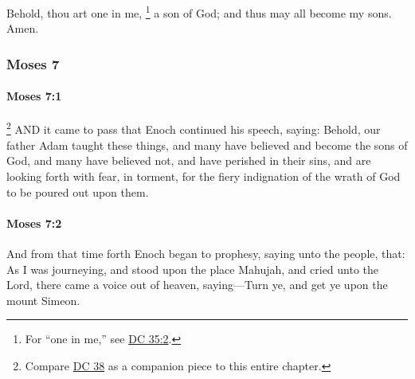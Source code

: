 			Behold, thou art one in me,%
				\footnote{%
					For ``one in me,'' see \hyperref[DC35-2]{DC 35:2}.
					}
			a son of God; and thus may all become my sons. Amen.

		
	\subsubsection{Moses 7} %
		\label{MOSES-7}
		
		\paragraph{Moses 7:1} %
			\label{MOSES-7-1}

				\footnote{%
					Compare \hyperref[DC38]{DC 38} as a companion piece to this entire chapter.
					}%
			AND it came to pass that Enoch continued his speech, saying: Behold, our father Adam taught these things, and many have believed and become the sons of God, and many have believed not, and have perished in their sins, and are looking forth with fear, in torment, for the fiery indignation of the wrath of God to be poured out upon them.


		\paragraph{Moses 7:2} %
			\label{MOSES-7-2}

			And from that time forth Enoch began to prophesy, saying unto the people, that: As I was journeying, and stood upon the place Mahujah, and cried unto the Lord, there came a voice out of heaven, saying---Turn ye, and get ye upon the mount Simeon.

